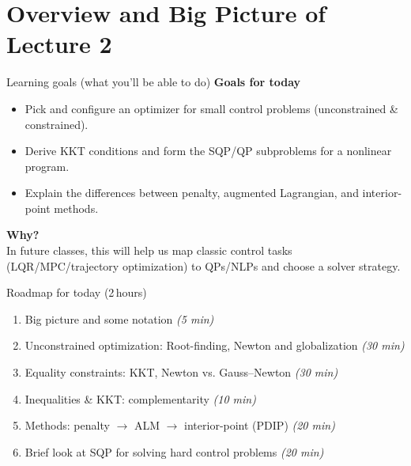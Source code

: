 
\begin{frame}[plain]
  \titlepage
\end{frame}
\section{Overview and Big Picture of Lecture 2}

\begin{frame}{Learning goals (what you’ll be able to do)}
\textbf{Goals for today}
\begin{itemize}
\item Pick and configure an optimizer for small control problems (unconstrained \& constrained).
\item Derive KKT conditions and form the SQP/QP subproblems for a nonlinear program.
\item Explain the differences between penalty, augmented Lagrangian, and interior-point methods.
\end{itemize}
\textbf{Why?}\\
In future classes, this will help us map classic control tasks (LQR/MPC/trajectory optimization) to QPs/NLPs and choose a solver strategy.
\end{frame}

\begin{frame}{Roadmap for today (2\,hours)}
\begin{enumerate}
\item Big picture and some notation \hfill \textit{(5 min)}
\item Unconstrained optimization: Root-finding, Newton and globalization \hfill \textit{(30 min)}
\item Equality constraints: KKT, Newton vs. Gauss–Newton \hfill \textit{(30 min)}
\item Inequalities \& KKT: complementarity \hfill \textit{(10 min)}
\item Methods: penalty $\rightarrow$ ALM $\rightarrow$ interior-point (PDIP) \hfill \textit{(20 min)}
\item Brief look at SQP for solving hard control problems \hfill \textit{(20 min)} 
\end{enumerate}
\end{frame}



